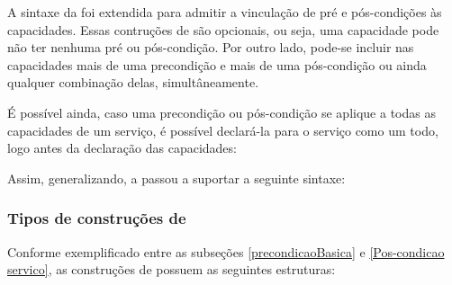 \begin{center}
\end{center}

A sintaxe da \neoidl{} foi extendida para admitir a vinculação de pré e
pós-condições às capacidades. Essas contruções de \designbycontract{} são
opcionais, ou seja, uma capacidade pode não ter nenhuma pré ou pós-condição. Por
outro lado, pode-se incluir nas capacidades mais de uma precondição e mais de
uma pós-condição ou ainda qualquer combinação delas, simultâneamente.

\begin{center}
\end{center}

É possível ainda, caso uma precondição ou pós-condição se aplique a todas as
capacidades de um serviço, é possível declará-la para o serviço como um todo,
logo antes da declaração das capacidades:

\begin{center}
\end{center}

 Assim, generalizando, a \neoidl{} passou a suportar a seguinte sintaxe:
 
\begin{center}
\end{center}
 

\subsubsection{Tipos de construções de \designbycontract{}}
\label{TiposContrDbC}

Conforme exemplificado entre as subseções \ref{precondicaoBasica} e
\ref{Pos-condicao servico}, as construções de \designbycontract{} possuem as
seguintes estruturas:

\begin{center}

\end{center}

